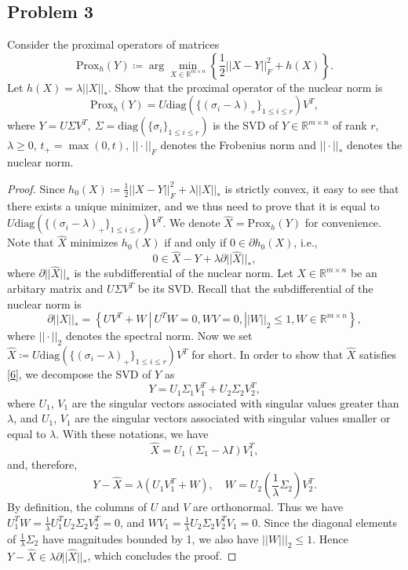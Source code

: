 \documentclass[11pt]{article}
\begin{document}
\subsection*{Problem 3}
Consider the proximal operators of matrices
\[
\text{Prox}_h(Y) \coloneqq \arg\min_{X\in\mathbb{R}^{m\times n}}\left\{\frac{1}{2}||X-Y||_{F}^2+h(X)\right\}. 
\]
Let $h(X)=\lambda||X||_*$. Show that the proximal operator of the nuclear norm is 
\[
\text{Prox}_h(Y) = U\text{diag}(\{(\sigma_i-\lambda)_{+}\}_{1\leq i\leq r})V^{T},
\]
where $Y=U\Sigma V^{T},\ \Sigma=\text{diag}(\{\sigma_i\}_{1\leq i\leq r})$ is the SVD of $Y\in\mathbb{R}^{m\times n}$ of rank $r$, $\lambda\geq0$, $t_{+}=\max(0,t)$, $||\cdot||_F$ denotes the Frobenius norm and $||\cdot||_*$ denotes the nuclear norm. 

\begin{proof}
Since $h_0(X)\coloneqq\frac{1}{2}||X-Y||_{F}^2+\lambda||X||_*$ is strictly convex, it easy to see that there exists a unique minimizer, and we thus need to prove that it is equal to $U\text{diag}(\{(\sigma_i-\lambda)_{+}\}_{1\leq i\leq r})V^{T}$. We denote $\hat X=\text{Prox}_h(Y)$ for convenience. Note that $\hat X$ minimizes $h_0(X)$ if and only if $0\in\partial h_0(X)$, i.e.,
\begin{equation}
    \label{6}
    0 \in \hat X-Y+\lambda\partial||\hat X||_*, 
\end{equation}
where $\partial||\hat X||_*$ is the subdifferential of the nuclear norm. Let $X\in\mathbb{R}^{m\times n}$ be an arbitary matrix and $U\Sigma V^{T}$ be its SVD. Recall that the subdifferential of the nuclear norm is
\[
\partial||X||_* = \left\{UV^{T} + W\ | \ U^{T}W = 0, WV = 0, ||W||_2 \leq 1, W\in\mathbb{R}^{m\times n}\right\},
\]
where $||\cdot||_2$ denotes the spectral norm. Now we set $\hat X\coloneqq U\text{diag}(\{(\sigma_i-\lambda)_{+}\}_{1\leq i\leq r})V^{T}$ for short. In order to show that $\hat X$ satisfies \eqref{6}, we decompose the SVD of $Y$ as 
\[
Y = U_1\Sigma_1V_1^{T}+U_2\Sigma_2V_2^{T},
\]
where $U_1$, $V_1$ are the singular vectors associated with singular values greater than $\lambda$, and $U_1$, $V_1$ are the singular vectors associated with singular values smaller or equal to $\lambda$. With these notations, we have 
\[
\hat X = U_1(\Sigma_1-\lambda I)V_1^{T},
\]
and, therefore, 
\[
Y-\hat X = \lambda(U_1V_1^{T}+W), \quad W = U_2(\frac{1}{\lambda}\Sigma_2)V_2^{T}.
\]
By definition, the columns of $U$ and $V$ are orthonormal. Thus we have $U_1^{T}W=\frac{1}{\lambda}U_1^{T}U_2\Sigma_2V_2^{T}=0$, and $WV_1=\frac{1}{\lambda}U_2\Sigma_2V_2^{T}V_1=0$. Since the diagonal elements of $\frac{1}{\lambda}\Sigma_2$ have magnitudes bounded by 1, we also have $||W|||_2\leq1$. Hence $Y-\hat X \in \lambda\partial||\hat X||_*$, which concludes the proof. 
\end{proof}
\end{document}
